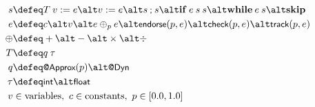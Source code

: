 \begin{align*}
    s &\defeq
        T \> v := e \alt
        v := e \alt
        s\:\csemi\:s \alt
        \mathbf{if}\:e\:s\:s \alt
        \mathbf{while}\:e\:s \alt
        \mathbf{skip} \\
    e &\defeq
        c \alt
        v \alt
        e \oplus_p e \alt
        \mcode{endorse}(p, e) \alt
        \mcode{check}(p, e) \alt
        \mcode{track}(p, e) \\
    \oplus &\defeq
        + \alt - \alt \times \alt \div \\
    T &\defeq
        q \> \tau \\
    q &\defeq
        \ApproxN{p} \alt
        \Dyn \\
    \tau &\defeq
        \mcode{int} \alt \mcode{float} \\
    v &\in \mathrm{variables},
        ~c \in \mathrm{constants},
        ~p \in [0.0, 1.0]
\end{align*}
